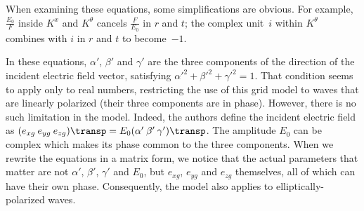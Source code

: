 \begin{refsection}
When examining these equations, some simplifications are obvious.
For example, $\frac{E_0}{F}$ inside $K^x$ and $K^\theta$ cancels $\frac{F}{E_0}$ in $r$ and $t$;
the complex unit~$i$ within $K^\theta$ combines with $i$ in $r$ and $t$ to become~$-1$.

In these equations, $\alpha'$, $\beta'$ and $\gamma'$ are the three components of the direction of the incident electric field vector, satisfying $\alpha'^2 + \beta'^2 + \gamma'^2 = 1$.
That condition seems to apply only to real numbers, restricting the use of this grid model to waves that are linearly polarized (their three components are in phase).
However, there is no such limitation in the model.
Indeed, the authors define the incident electric field as
$(e_{xg} \: e_{yg} \: e_{zg})\transp = E_0(\alpha' \: \beta' \: \gamma')\transp$.
The amplitude $E_0$ can be complex which makes its phase common to the three components.
When we rewrite the equations in a matrix form, we notice that the actual parameters that matter are not $\alpha'$, $\beta'$, $\gamma'$ and $E_0$, but $e_{xg}$, $e_{yg}$ and $e_{zg}$ themselves, all of which can have their own phase.
Consequently, the model also applies to elliptically-polarized waves.


\end{refsection}
